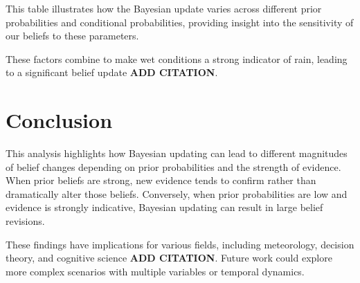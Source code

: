 \documentclass[10pt,letterpaper]{article}
\begin{document}
This table illustrates how the Bayesian update varies across different prior probabilities and conditional probabilities, providing insight into the sensitivity of our beliefs to these parameters.

These factors combine to make wet conditions a strong indicator of rain, leading to a significant belief update \textbf{ADD CITATION}.

\section{Conclusion}
This analysis highlights how Bayesian updating can lead to different magnitudes of belief changes depending on prior probabilities and the strength of evidence. When prior beliefs are strong, new evidence tends to confirm rather than dramatically alter those beliefs. Conversely, when prior probabilities are low and evidence is strongly indicative, Bayesian updating can result in large belief revisions.

These findings have implications for various fields, including meteorology, decision theory, and cognitive science \textbf{ADD CITATION}. Future work could explore more complex scenarios with multiple variables or temporal dynamics.
\end{document}
